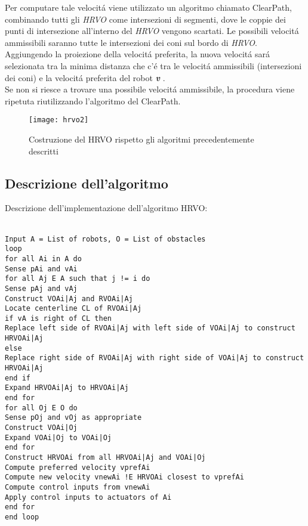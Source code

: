 Per computare tale velocit\'a viene utilizzato un algoritmo chiamato ClearPath, combinando tutti gli \textit{HRVO} come intersezioni di segmenti, dove le coppie dei punti di intersezione all'interno del \textit{HRVO} vengono scartati. Le possibili velocit\'a ammissibili saranno tutte le intersezioni dei coni sul bordo di \textit{HRVO}. Aggiungendo la proiezione della velocit\'a preferita, la nuova velocit\'a sar\'a selezionata tra la minima distanza che c'\'e tra le velocit\'a ammissibili (intersezioni dei coni) e la velocit\'a preferita del robot {\bfseries\textit{v}} . 
\\ Se non si riesce a trovare una possibile velocit\'a ammissibile, la procedura viene ripetuta riutilizzando l'algoritmo del ClearPath.

\begin{figure}
\centering 
\texttt{[image: hrvo2]} 
\caption[Costruzione del HRVO rispetto gli algoritmi precedentemente descritti]{Costruzione del HRVO rispetto gli algoritmi precedentemente descritti}
\label{fig:hrvo} 
\end{figure}

\subsection{Descrizione dell'algoritmo}

Descrizione dell'implementazione dell'algoritmo HRVO:
\\
\\
\begin{lstlisting}
Input A = List of robots, O = List of obstacles
loop
for all Ai in A do
Sense pAi and vAi
for all Aj E A such that j != i do
Sense pAj and vAj
Construct VOAi|Aj and RVOAi|Aj
Locate centerline CL of RVOAi|Aj
if vA is right of CL then
Replace left side of RVOAi|Aj with left side of VOAi|Aj to construct HRVOAi|Aj
else
Replace right side of RVOAi|Aj with right side of VOAi|Aj to construct HRVOAi|Aj
end if
Expand HRVOAi|Aj to HRVOAi|Aj
end for
for all Oj E O do
Sense pOj and vOj as appropriate
Construct VOAi|Oj
Expand VOAi|Oj to VOAi|Oj
end for
Construct HRVOAi from all HRVOAi|Aj and VOAi|Oj
Compute preferred velocity vprefAi
Compute new velocity vnewAi !E HRVOAi closest to vprefAi
Compute control inputs from vnewAi
Apply control inputs to actuators of Ai
end for
end loop

\end{lstlisting}











